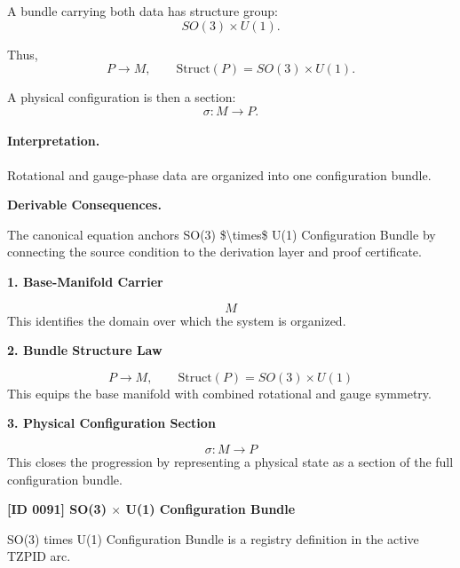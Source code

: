 A bundle carrying both data has structure group:
\begin{equation}
SO(3)\times U(1).
\end{equation}

Thus,
\begin{equation}
P\to M,
\qquad
\mathrm{Struct}(P)=SO(3)\times U(1).
\end{equation}

A physical configuration is then a section:
\begin{equation}
\boxed{
\sigma:M\to P.
}
\end{equation}

\paragraph{Interpretation.}
Rotational and gauge-phase data are organized into one configuration bundle.

\par\vspace{0.35em}
\noindent\textbf{Derivable Consequences.}\quad
\begingroup
\footnotesize
\raggedright
The canonical equation anchors SO(3) \$\textbackslash{}times\$ U(1) Configuration Bundle by connecting the source condition to the derivation layer and proof certificate.
\par\endgroup

\noindent\textbf{1. Base-Manifold Carrier}\par
\[
M
\]
\noindent This identifies the domain over which the system is organized.\par
\noindent\textbf{2. Bundle Structure Law}\par
\[
P \longrightarrow M,
\qquad
\mathrm{Struct}(P)=SO(3) \times U(1)
\]
\noindent This equips the base manifold with combined rotational and gauge symmetry.\par
\noindent\textbf{3. Physical Configuration Section}\par
\[
\sigma : M \longrightarrow P
\]
\noindent This closes the progression by representing a physical state as a section of the full configuration bundle.\par

\clearpage
\noindent\textbf{[ID 0091] SO(3) $\times$ U(1) Configuration Bundle}\par
\vspace{0.35em}
\begingroup\small
{}
SO(3) times U(1) Configuration Bundle is a registry definition in the active TZPID arc.

